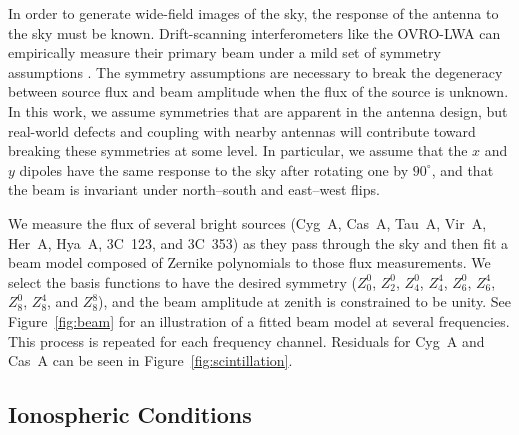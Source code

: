 \documentclass[twocolumn]{aastex61}
\begin{document}
In order to generate wide-field images of the sky, the response of the antenna to the sky must be
known. Drift-scanning interferometers like the OVRO-LWA can empirically measure their primary beam
under a mild set of symmetry assumptions \citep{2012AJ....143...53P}. The symmetry assumptions are
necessary to break the degeneracy between source flux and beam amplitude when the flux of the source
is unknown. In this work, we assume symmetries that are apparent in the antenna design, but
real-world defects and coupling with nearby antennas will contribute toward breaking these
symmetries at some level. In particular, we assume that the $x$ and $y$ dipoles have the same
response to the sky after rotating one by $90^\circ$, and that the beam is invariant under
north--south and east--west flips.

We measure the flux of several bright sources (Cyg~A, Cas~A, Tau~A, Vir~A, Her~A, Hya~A, 3C~123, and
3C~353) as they pass through the sky and then fit a beam model composed of Zernike polynomials to
those flux measurements. We select the basis functions to have the desired symmetry ($Z_0^0$,
$Z_2^0$, $Z_4^0$, $Z_4^4$, $Z_6^0$, $Z_6^4$, $Z_8^0$, $Z_8^4$, and $Z_8^8$), and the beam amplitude
at zenith is constrained to be unity. See Figure~\ref{fig:beam} for an illustration of a fitted beam
model at several frequencies. This process is repeated for each frequency channel. Residuals for
Cyg~A and Cas~A can be seen in Figure~\ref{fig:scintillation}.

\subsection{Ionospheric Conditions}\label{sec:ionosphere-conditions}
\end{document}
